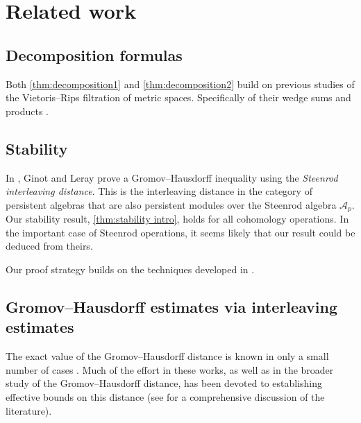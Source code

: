
\section*{Related work}

\subsection*{Decomposition formulas}

Both \cref{thm:decomposition1} and \cref{thm:decomposition2} build on previous studies of the Vietoris--Rips filtration of metric spaces.
Specifically of their wedge sums \cite{adamaszek2020homotopy} and products \cite{adamaszek2017VietorisProduct, gakhar2019k, lim2024vietoris}.

\subsection*{Stability}

In \cite[Theorem~87]{ginot2019distances}, Ginot and Leray prove a Gromov--Hausdorff inequality using the \textit{Steenrod interleaving distance}.
This is the interleaving distance in the category of persistent algebras that are also persistent modules over the Steenrod algebra \(\mathcal{A}_p\).
Our stability result, \cref{thm:stability intro}, holds for all cohomology operations.
In the important case of Steenrod operations, it seems likely that our result could be deduced from theirs.

Our proof strategy builds on the techniques developed in \cite{zhou2023beyond,memoli2024persistent}.

\subsection*{Gromov--Hausdorff estimates via interleaving estimates}

The exact value of the Gromov--Hausdorff distance is known in only a small number of cases \cite{memoli2012some,ji2021gromov,adams2022gromov,talipov2022gromov,lim2021gromov,harrison2023quantitative,saul2024gromov,saul2024some}.
Much of the effort in these works, as well as in the broader study of the Gromov--Hausdorff distance, has been devoted to establishing effective bounds on this distance (see \cite{lim2021gromov} for a comprehensive discussion of the literature).

